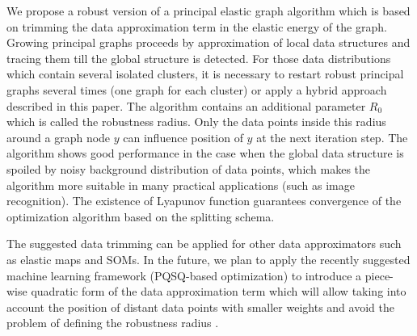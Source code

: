 \documentclass[graybox]{archivesofdatascience}
\begin{document}
We propose a robust version of a principal elastic graph algorithm which is based on trimming the data approximation term in the elastic energy of the graph. 
Growing principal graphs proceeds by approximation of local data structures and tracing them till the global structure is detected. 
For those data distributions which contain several isolated clusters, it is necessary to restart robust principal graphs several times
(one graph for each cluster) or apply a hybrid approach described in this paper. The algorithm contains an additional parameter $R_0$ which is called the robustness radius. 
Only the data points inside this radius around a graph node $y$ can influence position of $y$ at the next iteration step. 
The algorithm shows good performance in the case when the global data structure is spoiled by noisy background distribution of data points, 
which makes the algorithm more suitable in many practical applications (such as image recognition). The existence of Lyapunov function guarantees convergence 
of the optimization algorithm based on the splitting schema.

The suggested data trimming can be applied for other data approximators such as elastic maps and SOMs. 
In the future, we plan to apply the recently suggested machine learning framework (PQSQ-based optimization) to introduce a piece-wise quadratic 
form of the data approximation term which will allow taking into account the position of distant data points with smaller weights and avoid the problem
of defining the robustness radius \citep{Gorban2016NeuralNetworks}.

\FloatBarrier

{
\FloatBarrier

}
\end{document}
